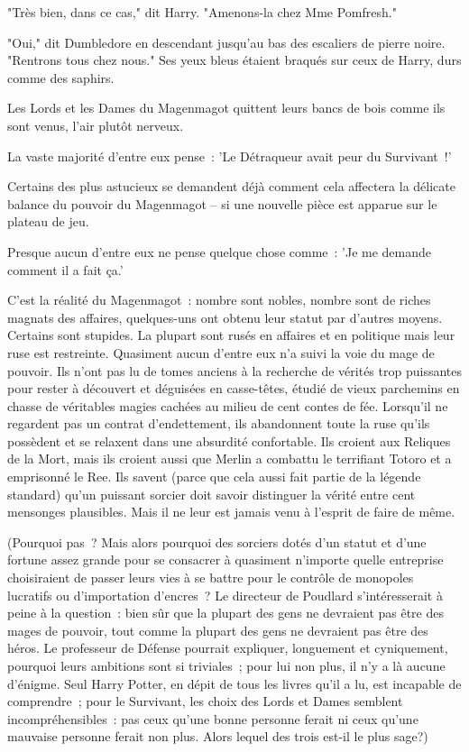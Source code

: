 "Très bien, dans ce cas," dit Harry. "Amenons-la chez Mme Pomfresh."

"Oui," dit Dumbledore en descendant jusqu'au bas des escaliers de pierre noire. "Rentrons tous chez nous." Ses yeux bleus étaient braqués sur ceux de Harry, durs comme des saphirs.

\later

Les Lords et les Dames du Magenmagot quittent leurs bancs de bois comme ils sont venus, l'air plutôt nerveux.

La vaste majorité d'entre eux pense~: 'Le Détraqueur avait peur du Survivant~!'

Certains des plus astucieux se demandent déjà comment cela affectera la délicate balance du pouvoir du Magenmagot -- si une nouvelle pièce est apparue sur le plateau de jeu.

Presque aucun d'entre eux ne pense quelque chose comme~: 'Je me demande comment il a fait ça.'

C'est la réalité du Magenmagot~: nombre sont nobles, nombre sont de riches magnats des affaires, quelques-uns ont obtenu leur statut par d'autres moyens. Certains sont stupides. La plupart sont rusés en affaires et en politique mais leur ruse est restreinte. Quasiment aucun d'entre eux n'a suivi la voie du mage de pouvoir. Ils n'ont pas lu de tomes anciens à la recherche de vérités trop puissantes pour rester à découvert et déguisées en casse-têtes, étudié de vieux parchemins en chasse de véritables magies cachées au milieu de cent contes de fée. Lorsqu'il ne regardent pas un contrat d'endettement, ils abandonnent toute la ruse qu'ils possèdent et se relaxent dans une absurdité confortable. Ils croient aux Reliques de la Mort, mais ils croient aussi que Merlin a combattu le terrifiant Totoro et a emprisonné le Ree. Ils savent (parce que cela aussi fait partie de la légende standard) qu'un puissant sorcier doit savoir distinguer la vérité entre cent mensonges plausibles. Mais il ne leur est jamais venu à l'esprit de faire de même.

(Pourquoi pas~? Mais alors pourquoi des sorciers dotés d'un statut et d'une fortune assez grande pour se consacrer à quasiment n'importe quelle entreprise choisiraient de passer leurs vies à se battre pour le contrôle de monopoles lucratifs ou d'importation d'encres~? Le directeur de Poudlard s'intéresserait à peine à la question~: bien sûr que la plupart des gens ne devraient pas être des mages de pouvoir, tout comme la plupart des gens ne devraient pas être des héros. Le professeur de Défense pourrait expliquer, longuement et cyniquement, pourquoi leurs ambitions sont si triviales~; pour lui non plus, il n'y a là aucune d'énigme. Seul Harry Potter, en dépit de tous les livres qu'il a lu, est incapable de comprendre~; pour le Survivant, les choix des Lords et Dames semblent incompréhensibles~: pas ceux qu'une bonne personne ferait ni ceux qu'une mauvaise personne ferait non plus. Alors lequel des trois est-il le plus sage?)

